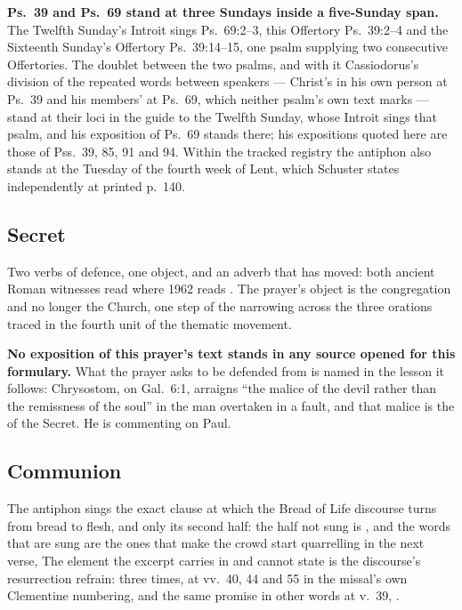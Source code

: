 \textbf{Ps.~39 and Ps.~69 stand at three Sundays inside a five-Sunday span.} The
Twelfth Sunday's Introit sings Ps.\ 69:2--3, this Offertory Ps.\ 39:2--4 and the
Sixteenth Sunday's Offertory Ps.\ 39:14--15, one psalm supplying two consecutive
Offertories. The doublet between the two psalms, and with it Cassiodorus's
division of the repeated words between speakers --- Christ's in his own person at
Ps.~39 and his members' at Ps.~69, which neither psalm's own text marks --- stand
at their loci in the guide to the Twelfth Sunday, whose Introit sings that psalm,
and his exposition of Ps.~69 stands there; his expositions quoted here are those
of Pss.\ 39, 85, 91 and 94. Within the tracked registry the antiphon also stands at the
Tuesday of the fourth week of Lent, which Schuster states independently at printed
p.~140.

\subsection*{Secret }

 Two verbs of defence, one object, and an adverb that has
moved: both ancient Roman witnesses read  where
1962 reads . The prayer's object is the
congregation and no longer the Church, one step of the narrowing across the
three orations traced in the fourth unit of the thematic movement.

\textbf{No exposition of this prayer's text stands in any source opened for this
formulary.} What the prayer asks to be defended from is named in
the lesson it follows: Chrysostom, on Gal.\ 6:1, arraigns ``the malice of the
devil rather than the remissness of the soul'' in the man overtaken in a fault,
and that malice is the  of the Secret. He is
commenting on Paul.

\subsection*{Communion }

The antiphon sings the exact clause at which the Bread of Life discourse turns
from bread to flesh, and only its second half: the half not sung is , and the words that are sung are the
ones that make the crowd start quarrelling in the next verse,  The element the excerpt carries in and cannot state is the
discourse's resurrection refrain: 
three times, at vv.~40, 44 and 55 in the missal's own Clementine numbering, and
the same promise in other words at v.~39, .

